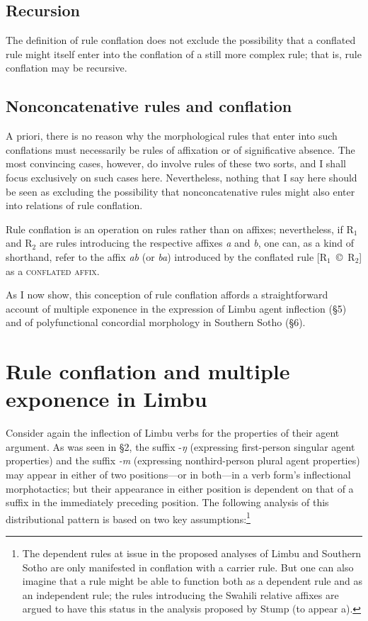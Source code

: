 \documentclass[output=paper,
modfonts
]{LSP/langsci}
\begin{document}
\subsection{Recursion}

The definition of rule conflation does not exclude the possibility that a conflated rule might itself enter into the conflation of a still more complex rule; that is, rule conflation may be recursive.

\subsection{Nonconcatenative rules and conflation}

A priori, there is no reason why the morphological rules that enter into such conflations must necessarily be rules of affixation or of significative absence.  The most convincing cases, however, do involve rules of these two sorts, and I shall focus exclusively on such cases here.  Nevertheless, nothing that I say here should be seen as excluding the possibility that nonconcatenative rules might also enter into relations of rule conflation.

Rule conflation is an operation on rules rather than on affixes; nevertheless, if R$_{1}$ and R$_{2}$ are rules introducing the respective affixes \textit{a} and \textit{b}, one can, as a kind of shorthand, refer to the affix \textit{ab} (or \textit{ba}) introduced by the conflated rule [R$_{1}$~©~R$_{2}$] as a \textsc{conflated affix.}

As I now show, this conception of rule conflation affords a straightforward account of multiple exponence in the expression of Limbu agent inflection (§5) and of polyfunctional concordial morphology in Southern Sotho (§6).  

\section{Rule conflation and multiple exponence in Limbu}

Consider again the inflection of Limbu verbs for the properties of their agent argument.  As was seen in §2, the suffix \nobreakdash-\textit{ŋ} (expressing first\nobreakdash-person singular agent properties) and the suffix \textit{\nobreakdash-m} (expressing nonthird\nobreakdash-person plural agent properties) may appear in either of two positions—or in both—in a verb form’s inflectional morphotactics; but their appearance in either position is dependent on that of a suffix in the immediately preceding position.  The following analysis of this distributional pattern is based on two key assumptions:\footnote{ The dependent rules at issue in the proposed analyses of Limbu and Southern Sotho are only manifested in conflation with a carrier rule.  But one can also imagine that a rule might be able to function both as a dependent rule and as an independent rule; the rules introducing the Swahili relative affixes are argued to have this status in the analysis proposed by Stump (to appear a).}
\end{document}
